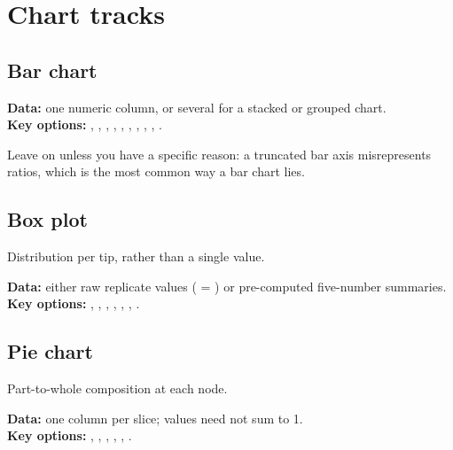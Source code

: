 \section{Chart tracks}

\subsection{Bar chart}

\textbf{Data:} one numeric column, or several for a stacked or grouped chart.\\
\textbf{Key options:} , , , ,
, , , ,
, .

Leave  on unless you have a specific reason: a truncated bar axis
misrepresents ratios, which is the most common way a bar chart lies.



\subsection{Box plot}

Distribution per tip, rather than a single value.

\textbf{Data:} either raw replicate values ( = ) or
pre-computed five-number summaries.\\
\textbf{Key options:} , , ,
, , , .


\subsection{Pie chart}

Part-to-whole composition at each node.

\textbf{Data:} one column per slice; values need not sum to 1.\\
\textbf{Key options:} , , ,
, , .

